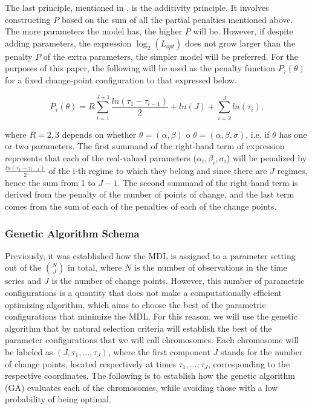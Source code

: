 \documentclass[APA,STIX1COL]{WileyNJD-v2}
\begin{document}
The last principle, mentioned in \cite{Li2012}, is the additivity principle. It involves constructing $P$ based on the sum of all the partial penalties mentioned above. The more parameters the model has, the higher $P$ will be. However, if despite adding parameters, the expression $\log_2(L_{opt})$ does not grow larger than the penalty $P$ of the extra parameters, the simpler model will be preferred. For the purposes of this paper, the following will be used as the
penalty function $P_{\tau}(\theta)$ for a fixed change-point configuration to that expressed below.

\begin{equation}
\label{eq7}
P_{\tau}(\theta)=R\sum_{i=1}^{J+1} \frac{ln(\tau_1-\tau_{i-1})}{2} +ln(J) + \sum_{i=2}^{J}ln(\tau_i),    
\end{equation}

where $R=2,3$ depends on whether $\theta=(\alpha, \beta)$ o $\theta=(\alpha, \beta,\sigma)$, i.e. if $\theta$ has one or two parameters. The first summand of the right-hand term of expression represents that each of the real-valued parameters ($\alpha_i, \beta_i,\sigma_i$) will be penalized by $\frac{ln(\tau_1-\tau_{i-1})}{2}$  of the i-th regime to which they belong and since there are $J$ regimes, hence the sum from 1 to $J-1$. The second summand of the right-hand term is derived from the penalty of the number of points
of change, and the last term comes from the sum of each of the penalties of each of the change points.\\



\subsubsection{Genetic Algorithm Schema}
\label{Genetic Algorithm Scheme}

Previously, it was established how the MDL is assigned to a parameter setting out of the ${N\choose J}$ in total, where $N$ is the number of observations in the time series and $J$ is the number of change points. However, this number of parametric configurations is a quantity that does not make a computationally efficient optimizing algorithm, which aims to choose the best of the parametric configurations that minimize the MDL. For this reason, we will use the genetic algorithm that by natural selection criteria will establish the best of the parameter configurations that we will  call chromosomes. Each chromosome will be labeled as $(J,\tau_{1},..., \tau_{J})$, where the first component $J$ stands for the number of change points, located respectively at times $\tau_{1},...,\tau_{J}$, corresponding to the respective coordinates. The following is to establish how the genetic algorithm (GA) evaluates each of the chromosomes, while avoiding those with a low probability of being optimal.\\
\end{document}
